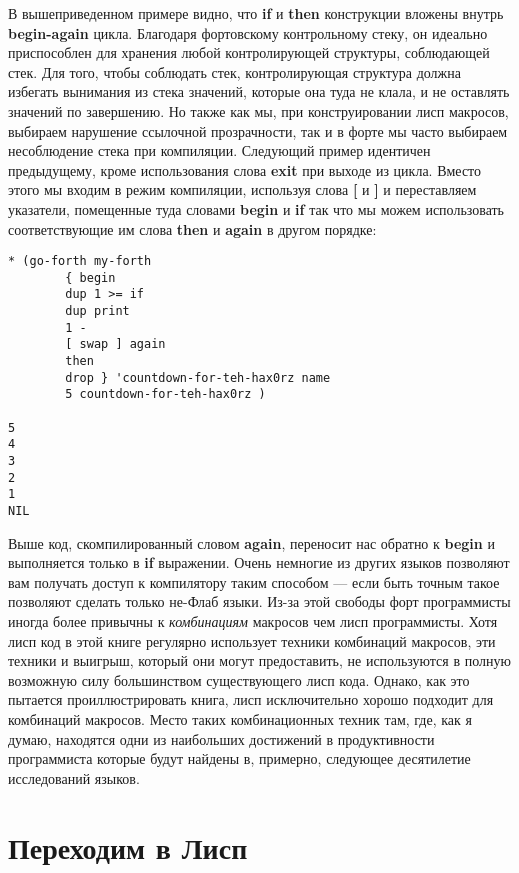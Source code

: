 В вышеприведенном примере видно, что \textbf{if} и \textbf{then} конструкции вложены внутрь \textbf{begin-again} цикла. Благодаря фортовскому контрольному стеку, он идеально приспособлен для хранения любой контролирующей структуры, соблюдающей стек. Для того, чтобы соблюдать стек, контролирующая структура должна избегать вынимания из стека значений, которые она туда не клала, и не оставлять значений по завершению. Но также как мы, при конструировании лисп макросов, выбираем нарушение ссылочной прозрачности, так и в форте мы часто выбираем несоблюдение стека при компиляции. Следующий пример идентичен предыдущему, кроме использования слова \textbf{exit} при выходе из цикла. Вместо этого мы входим в режим компиляции, используя слова \textbf{[} и \textbf{]} и переставляем указатели, помещенные туда словами \textbf{begin} и \textbf{if} так что мы можем использовать соответствующие им слова \textbf{then} и \textbf{again} в другом порядке: 

\begin{verbatim}
* (go-forth my-forth
	    { begin
	    dup 1 >= if
	    dup print
	    1 -
	    [ swap ] again
	    then
	    drop } 'countdown-for-teh-hax0rz name
	    5 countdown-for-teh-hax0rz )

5 
4 
3 
2 
1 
NIL
\end{verbatim}

Выше код, скомпилированный словом \textbf{again}, переносит нас обратно к \textbf{begin} и выполняется только в \textbf{if} выражении. Очень немногие из других языков позволяют вам получать доступ к компилятору таким способом --- если быть точным такое позволяют сделать только не-Флаб языки. Из-за этой свободы форт программисты иногда более привычны к \emph{комбинациям} макросов чем лисп программисты. Хотя лисп код в этой книге регулярно использует техники комбинаций макросов, эти техники и выигрыш, который они могут предоставить, не используются в полную возможную силу большинством существующего лисп кода. Однако, как это пытается проиллюстрировать книга, лисп исключительно хорошо подходит для комбинаций макросов. Место таких комбинационных техник там, где, как я думаю, находятся одни из наибольших достижений в продуктивности программиста которые будут найдены в, примерно, следующее десятилетие исследований языков.

\section{Переходим в Лисп}\label{section_going_lisp}

